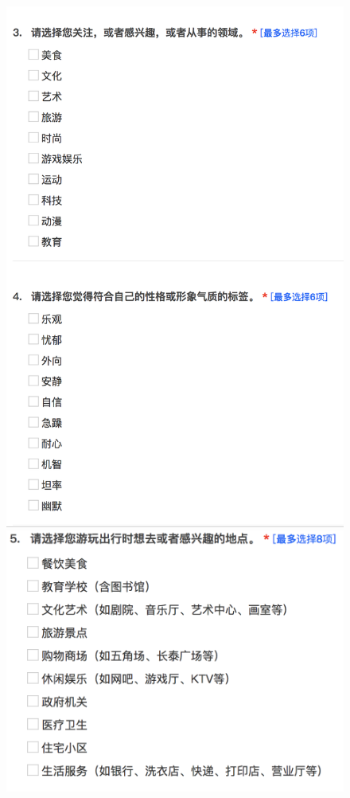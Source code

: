 \documentclass[UTF8]{article}
\begin{document}
\begin{figure}[H]
\begin{minipage}[t]{0.15\textwidth}
\end{minipage}
\begin{minipage}[t]{0.45\textwidth}
    \vspace{0pt}
    \includegraphics[width=\textwidth]{images/ques2.png}
\end{minipage}
\begin{minipage}[t]{0.4\textwidth}
    \vspace{0pt}
    \includegraphics[width=\textwidth]{images/ques3.png}

\end{minipage}
\end{figure}
\end{document}
